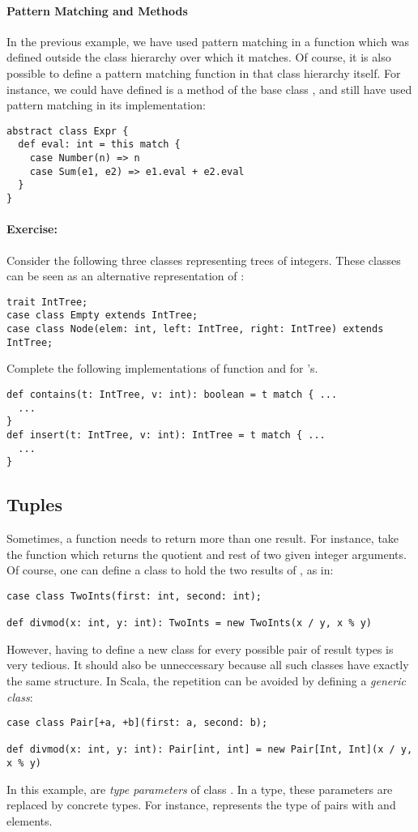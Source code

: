 \documentclass[a4paper,12pt,twoside,titlepage]{book}
\newcommand{\exercise}{\paragraph{Exercise:}}
\begin{document}
\paragraph{Pattern Matching and Methods}
In the previous example, we have used pattern
matching in a function which was defined outside the class hierarchy
over which it matches.  Of course, it is also possible to define a
pattern matching function in that class hierarchy itself. For
instance, we could have defined
 is a method of the base class , and still have used pattern matching in its implementation:
\begin{lstlisting}
abstract class Expr { 
  def eval: int = this match { 
    case Number(n) => n
    case Sum(e1, e2) => e1.eval + e2.eval 
  } 
}
\end{lstlisting}

\exercise
Consider the following three classes representing trees of integers. 
These classes can be seen as an alternative representation of :
\begin{lstlisting}
trait IntTree;
case class Empty extends IntTree;
case class Node(elem: int, left: IntTree, right: IntTree) extends IntTree;
\end{lstlisting}
Complete the following implementations of function  and  for 
's.
\begin{lstlisting} 
def contains(t: IntTree, v: int): boolean = t match { ... 
  ...
}
def insert(t: IntTree, v: int): IntTree = t match { ... 
  ...
}
\end{lstlisting}

\subsection*{Tuples}

Sometimes, a function needs to return more than one result. For
instance, take the function  which returns the quotient
and rest of two given integer arguments.  Of course, one can
define a class to hold the two results of , as in:
\begin{lstlisting}
case class TwoInts(first: int, second: int);

def divmod(x: int, y: int): TwoInts = new TwoInts(x / y, x % y)
\end{lstlisting}
However, having to define a new class for every possible pair of
result types is very tedious. It should also be unneccessary because
all such classes have exactly the same structure. In Scala, the
repetition can be avoided by defining a {\em generic class}:
\begin{lstlisting}
case class Pair[+a, +b](first: a, second: b);

def divmod(x: int, y: int): Pair[int, int] = new Pair[Int, Int](x / y, x % y)
\end{lstlisting}
In this example, \code{[a, b]} are {\em type parameters} of class
. In a  type, these parameters are replaced by
concrete types. For instance,  represents the
type of pairs with  and  elements.
\end{document}
